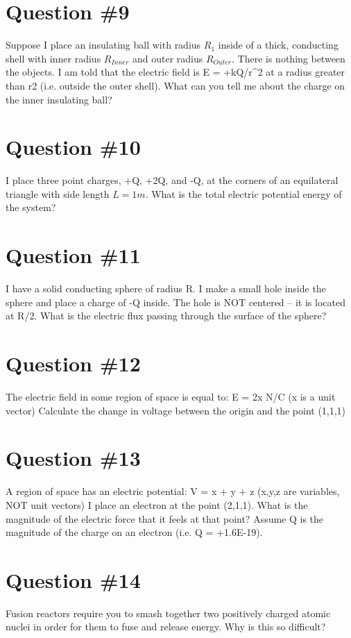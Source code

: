 \documentclass[12pt]{article}
\begin{document}
\section*{Question \#9}
Suppose I place an insulating ball with radius $R_1$ inside of a thick, conducting shell with inner radius $R_{Inner}$ and outer radius $R_{Outer}$.  There is nothing between the objects.  I am told that the electric field is E = +kQ/r^2 at a radius greater than r2 (i.e. outside the outer shell).  What can you tell me about the charge on the inner insulating ball?

\section*{Question \#10}
I place three point charges, +Q, +2Q, and -Q, at the corners of an equilateral triangle with side length $L = 1 m$.  What is the total electric potential energy of the system?

\section*{Question \#11}
I have a solid conducting sphere of radius R.  I make a small hole inside the sphere and place a charge of -Q inside.  The hole is NOT centered – it is located at R/2.  
What is the electric flux passing through the surface of the sphere?

\section*{Question \#12}
The electric field in some region of space is equal to:
E = 2x N/C (x is a unit vector)
Calculate the change in voltage between the origin and the point (1,1,1)

\section*{Question \#13}
A region of space has an electric potential:
V = x + y + z (x,y,z are variables, NOT unit vectors)
I place an electron at the point (2,1,1).  What is the magnitude of the electric force that it feels at that point?  Assume Q is the magnitude of the charge on an electron (i.e. Q = +1.6E-19).

\section*{Question \#14}
Fusion reactors require you to smash together two positively charged atomic nuclei in order for them to fuse and release energy.  Why is this so difficult?
\end{document}
